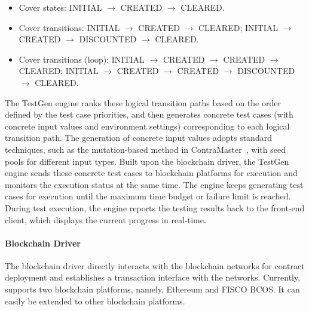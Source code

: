 {\small\begin{itemize}[leftmargin=*,topsep=2pt]
		\item Cover states: INITIAL $\rightarrow$ CREATED $\rightarrow$ CLEARED.
		\item Cover transitions: INITIAL $\rightarrow$ CREATED $\rightarrow$ CLEARED; INITIAL $\rightarrow$
		CREATED $\rightarrow$ DISCOUNTED $\rightarrow$ CLEARED.
		\item Cover transitions (loop): INITIAL $\rightarrow$ CREATED $\rightarrow$ CREATED $\rightarrow$
		CLEARED;
		INITIAL $\rightarrow$ CREATED $\rightarrow$ CREATED $\rightarrow$ DISCOUNTED $\rightarrow$ CLEARED.
\end{itemize}}

The TestGen engine ranks these logical transition paths based on the order defined by the test
case priorities, and then generates concrete test cases (with concrete input values and environment
settings) corresponding to each logical transition path.
The generation of concrete input values adopts standard
techniques, such as the mutation-based method in ContraMaster~\cite{wang2019vultron,wang2019oracle},
with seed pools for different input types.
Built upon the blockchain driver, the TestGen engine sends these concrete test cases to blockchain
platforms for execution and monitors the execution status at the same time.
The engine keeps generating test cases for execution until the maximum time budget or failure
limit is reached.
During test execution, the engine reports the testing results back to the front-end client, which
displays the current progress in real-time.



\paragraph{Blockchain Driver}
The blockchain driver directly interacts with the blockchain networks for contract deployment and
establishes a transaction interface with the networks.
Currently, \modcon supports two blockchain platforms, namely, Ethereum and FISCO BCOS.
It can easily be extended to other blockchain platforms.


